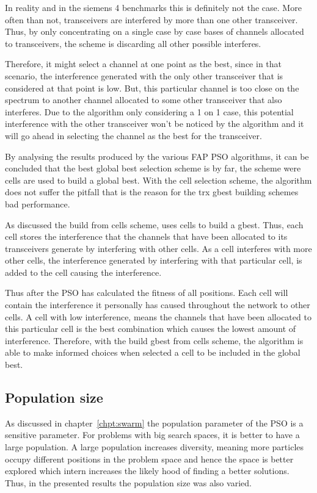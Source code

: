 In reality and in the siemens 4 benchmarks this is definitely not the case. More often than not, transceivers are interfered by more than one other transceiver. Thus, by only concentrating on a single case by case bases of channels allocated to transceivers, the scheme is discarding all other possible interferes. 

Therefore, it might select a channel at one point as the best, since in that scenario, the interference generated with the only other transceiver that is considered at that point is low. But, this particular channel is too close on the spectrum to another channel allocated to some other transceiver that also interferes. Due to the algorithm only considering a 1 on 1 case, this potential interference with the other transceiver won't be noticed by the algorithm and it will go ahead in selecting the channel as the best for the transceiver.

By analysing the results produced by the various FAP PSO algorithms, it can be concluded that the best global best selection scheme is by far, the scheme were cells are used to build a global best. With the cell selection scheme, the algorithm does not suffer the pitfall that is the reason for the trx gbest building schemes bad performance.

As discussed the build from cells scheme, uses cells to build a gbest. Thus, each cell stores the interference that the channels that have been allocated to its transceivers generate by interfering with other cells. As a cell interferes with more other cells, the interference generated by interfering with that particular cell, is added to the cell causing the interference.

Thus after the PSO has calculated the fitness of all positions. Each cell will contain the interference it personally has caused throughout the network to other cells. A cell with low interference, means the channels that have been allocated to this particular cell is the best combination which causes the lowest amount of interference. Therefore, with the build gbest from cells scheme, the algorithm is able to make informed choices when selected a cell to be included in the global best. 
\subsection{Population size}
As discussed in chapter~\ref{chpt:swarm} the population parameter of the PSO is a sensitive parameter. For problems with big search spaces, it is better to have a large population. A large population increases diversity, meaning more particles occupy different positions in the problem space and hence the space is better explored which intern increases the likely hood of finding a better solutions. Thus, in the presented results the population size was also varied.

